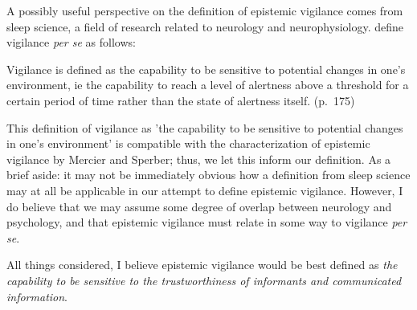 A possibly useful perspective on the definition of epistemic vigilance comes from sleep science, a field of research related to neurology and neurophysiology. \citet{VanSchie21} define vigilance \emph{per se} as follows:
\begin{quoting}
    Vigilance is defined as the capability to be sensitive to potential changes in one's environment, ie the capability to reach a level of alertness above a threshold for a certain period of time rather than the state of alertness itself.
    \hfill (p.~175)
\end{quoting}
This definition of vigilance as 'the capability to be sensitive to potential changes in one's environment' is compatible with the characterization of epistemic vigilance by Mercier and Sperber; thus, we let this inform our definition.
As a brief aside: it may not be immediately obvious how a definition from sleep science may at all be applicable in our attempt to define epistemic vigilance. However, I do believe that we may assume some degree of overlap between neurology and psychology, and that epistemic vigilance must relate in some way to vigilance \emph{per se}.

All things considered, I believe epistemic vigilance would be best defined as \emph{the capability to be sensitive to the trustworthiness of informants and communicated information}.

